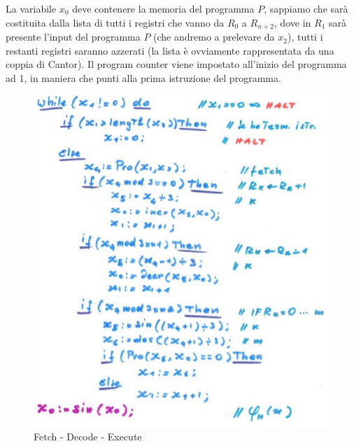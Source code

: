\documentclass{article}
\begin{document}
La variabile $x_0$ deve contenere la memoria del programma $P$, sappiamo che sarà
costituita dalla lista di tutti i registri che vanno da $R_0$ a $R_{n+2}$, dove in
$R_1$ sarà presente l'input del programma $P$ (che andremo a prelevare da $x_2$),
tutti i restanti registri saranno azzerati (la lista è ovviamente rappresentata
da una coppia di Cantor). Il program counter viene impostato all'inizio del programma
ad 1, in maniera che punti alla prima istruzione del programma.
\begin{figure}[H]
    \centering
    \includegraphics[scale=0.5]{images/fetch_decode_execute.png}
    \caption{Fetch - Decode - Execute}
\end{figure}
\end{document}
